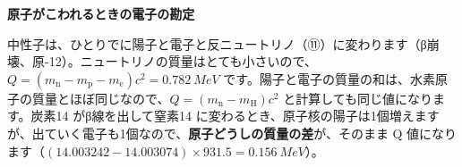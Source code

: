 \begin{motto}[3]
\textbf{原子がこわれるときの電子の勘定}\par
中性子は、ひとりでに陽子と電子と反ニュートリノ（⑪）に変わります（β崩壊、原-12）。ニュートリノの質量はとても小さいので、$Q=(m_{\mathrm n}-m_{\mathrm p}-m_{\mathrm e})c^2=\qty{0.782}{MeV}$ です。陽子と電子の質量の和は、水素原子の質量とほぼ同じなので、$Q=(m_{\mathrm n}-m_{\mathrm H})c^2$ と計算しても同じ値になります。炭素14 がβ線を出して窒素14 に変わるとき、原子核の陽子は1個増えますが、出ていく電子も1個なので、\textbf{原子どうしの質量の差}が、そのまま Q 値になります（$(14.003242-14.003074)\times931.5=\qty{0.156}{MeV}$）。
\end{motto}

\begin{phmodel}
\end{phmodel}

\phkokomade


